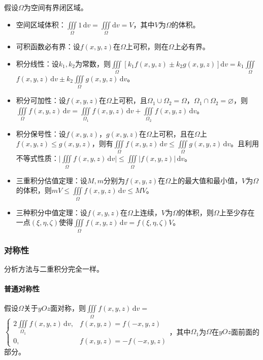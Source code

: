 \documentclass[UTF8, 12pt]{ctexart}
\begin{document}
假设$\Omega$为空间有界闭区域。

\begin{itemize}
    \item 空间区域体积：$\iiint\limits_\Omega1\,\textrm{d}v=\iiint\limits_\Omega\textrm{d}v=V$，其中$V$为$\Omega$的体积。
    \item 可积函数必有界：设$f(x,y,z)$在$\Omega$上可积，则在$\Omega$上必有界。
    \item 积分线性：设$k_1,k_2$为常数，则$\iiint\limits_\Omega[k_1f(x,y,z)\pm k_2g(x,y,z)]\textrm{d}v=k_1\iiint\limits_\Omega$\\$f(x,y,z)\,\textrm{d}v\pm k_2\iiint\limits_\Omega g(x,y,z)\,\textrm{d}v$。
    \item 积分可加性：设$f(x,y,z)$在$\Omega$上可积，且$\Omega_1\cup\Omega_2=\Omega$，$\Omega_1\cap\Omega_2=\varnothing$，则$\iiint\limits_\Omega f(x,y,z)\,\textrm{d}v=\iiint\limits_{\Omega_1}f(x,y,z)\,\textrm{d}v+\iiint\limits_{\Omega_2}f(x,y,z)\,\textrm{d}v$。
    \item 积分保号性：设$f(x,y,z)$，$g(x,y,z)$在$\Omega$上可积，且在$\Omega$上$f(x,y,z)\leqslant g(x,y,z)$，则有$\iiint\limits_\Omega f(x,y,z)\,\textrm{d}v\leqslant\iiint\limits_\Omega g(x,y,z)\,\textrm{d}v$。且利用不等式性质：$\vert\iiint\limits_\Omega f(x,y,z)\,\textrm{d}v\vert\leqslant\iiint\limits_\Omega\vert f(x,y,z)\vert\,\textrm{d}v$。
    \item 三重积分估值定理：设$M,m$分别为$f(x,y,z)$在$\Omega$上的最大值和最小值，$V$为$\Omega$的体积，则$mV\leqslant\iiint\limits_\Omega f(x,y,z)\,\textrm{d}v\leqslant MV$。
    \item 三种积分中值定理：设$f(x,y,z)$在$\Omega$上连续，$V$为$\Omega$的体积，则$\Omega$上至少存在一点$(\xi,\eta,\zeta)$使得$\iiint\limits_\Omega f(x,y,z)\,\textrm{d}v=f(\xi,\eta,\zeta)V$。
\end{itemize}

\subsubsection{对称性}

分析方法与二重积分完全一样。

\paragraph{普通对称性} \leavevmode \medskip

假设$\Omega$关于$yOz$面对称，则$\iiint\limits_\Omega f(x,y,z)\,\textrm{d}v=$\\$\left\{\begin{array}{ll}
    2\iiint\limits_{\Omega_1}f(x,y,z)\,\textrm{d}v, & f(x,y,z)=f(-x,y,z) \\
    0, & f(x,y,z)=-f(-x,y,z)
\end{array}\right.$，其中$\Omega_1$为$\Omega$在$yOz$面前面的部分。
\end{document}

